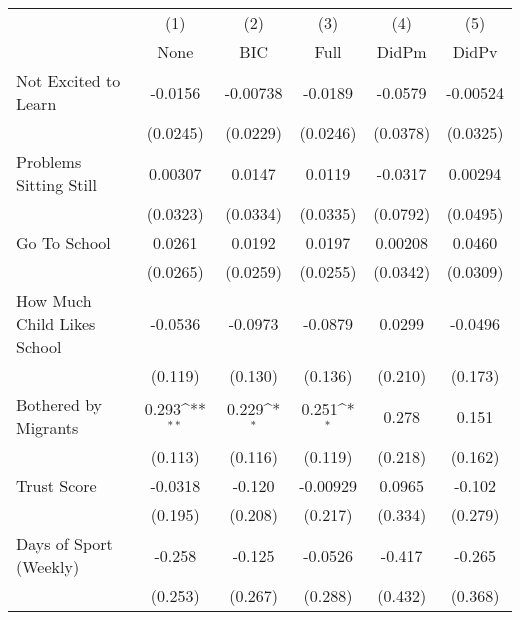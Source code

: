 {
\def\sym#1{\ifmmode^{#1}\else\(^{#1}\)\fi}
\begin{tabular}{l*{5}{c}}
\toprule
            &\multicolumn{1}{c}{(1)}&\multicolumn{1}{c}{(2)}&\multicolumn{1}{c}{(3)}&\multicolumn{1}{c}{(4)}&\multicolumn{1}{c}{(5)}\\
            &\multicolumn{1}{c}{None}&\multicolumn{1}{c}{BIC}&\multicolumn{1}{c}{Full}&\multicolumn{1}{c}{DidPm}&\multicolumn{1}{c}{DidPv}\\
\midrule
Not Excited to Learn&     -0.0156         &    -0.00738         &     -0.0189         &     -0.0579         &    -0.00524         \\
            &    (0.0245)         &    (0.0229)         &    (0.0246)         &    (0.0378)         &    (0.0325)         \\
\addlinespace
Problems Sitting Still&     0.00307         &      0.0147         &      0.0119         &     -0.0317         &     0.00294         \\
            &    (0.0323)         &    (0.0334)         &    (0.0335)         &    (0.0792)         &    (0.0495)         \\
\addlinespace
Go To School&      0.0261         &      0.0192         &      0.0197         &     0.00208         &      0.0460         \\
            &    (0.0265)         &    (0.0259)         &    (0.0255)         &    (0.0342)         &    (0.0309)         \\
\addlinespace
How Much Child Likes School&     -0.0536         &     -0.0973         &     -0.0879         &      0.0299         &     -0.0496         \\
            &     (0.119)         &     (0.130)         &     (0.136)         &     (0.210)         &     (0.173)         \\
\addlinespace
Bothered by Migrants&       0.293\sym{**} &       0.229\sym{*}  &       0.251\sym{*}  &       0.278         &       0.151         \\
            &     (0.113)         &     (0.116)         &     (0.119)         &     (0.218)         &     (0.162)         \\
\addlinespace
Trust Score &     -0.0318         &      -0.120         &    -0.00929         &      0.0965         &      -0.102         \\
            &     (0.195)         &     (0.208)         &     (0.217)         &     (0.334)         &     (0.279)         \\
\addlinespace
Days of Sport (Weekly)&      -0.258         &      -0.125         &     -0.0526         &      -0.417         &      -0.265         \\
            &     (0.253)         &     (0.267)         &     (0.288)         &     (0.432)         &     (0.368)         \\
\bottomrule
\end{tabular}
}
